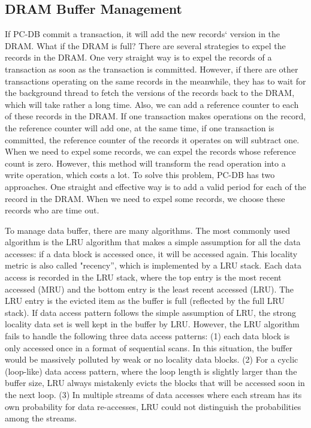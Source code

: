 \subsection{DRAM Buffer Management}
If PC-DB commit a transaction, it will add the new records` version in the DRAM. What if the DRAM is full? There are several strategies to expel the records in the DRAM. One very straight way is to expel the records of a transaction as soon as the transaction is committed. However, if there are other transactions operating on the same records in the meanwhile, they has to wait for the background thread to fetch the versions of the records back to the DRAM, which will take rather a long time. Also, we can  add a reference counter to each of these records in the DRAM. If one transaction makes operations on the record, the reference counter will add one, at the same time, if one transaction is committed, the reference counter of the records it operates on will subtract one. When we need to expel some records, we can expel the records whose reference count is zero. However, this method will transform the read operation into a write operation, which costs a lot. To solve this problem, PC-DB has two approaches. One straight and effective way is to add a valid period for each of the record in the DRAM. When we need to expel some records, we choose these records who are time out. 

To manage data buffer, there are many algorithms. The most commonly used algorithm is the LRU algorithm that makes a simple assumption for all the data accesses: if a data block is accessed once, it will be accessed again. This locality metric is also called "recency'', which is implemented by a LRU stack. Each data access is recorded in the LRU stack, where the top entry is the most recent accessed (MRU) and the bottom entry is the least recent accessed (LRU). The LRU entry is the evicted item as the buffer is full (reflected by the full LRU stack). If data access pattern follows the simple assumption of LRU, the strong locality data set is well kept in the buffer by LRU. However, the LRU algorithm fails to handle the following three data access patterns: (1) each data block is only accessed once in a format of sequential scans. In this situation, the buffer would be massively polluted by weak or no locality data blocks. (2) For a cyclic (loop-like) data access pattern, where the loop length is slightly larger than the buffer size, LRU always mistakenly evicts the blocks that will be accessed soon in the next loop. (3) In multiple streams of data accesses where each stream has its own probability for data re-accesses, LRU could not distinguish the probabilities among the streams. 

